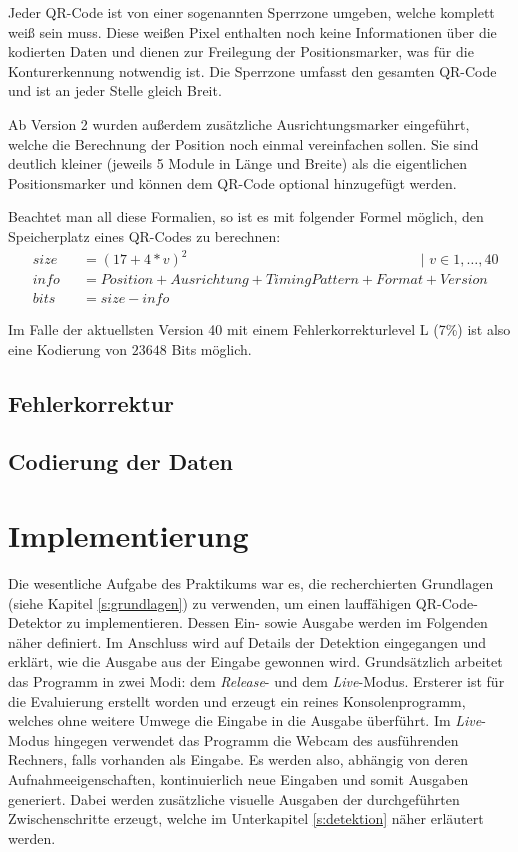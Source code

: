 \documentclass[a4paper, oneside, 12pt]{article}
\begin{document}
Jeder QR-Code ist von einer sogenannten Sperrzone umgeben, welche komplett weiß sein muss. Diese weißen Pixel enthalten noch keine Informationen über die kodierten Daten und dienen zur Freilegung der Positionsmarker, was für die Konturerkennung notwendig ist. Die Sperrzone umfasst den gesamten QR-Code und ist an jeder Stelle gleich Breit.

Ab Version 2 wurden außerdem zusätzliche Ausrichtungsmarker eingeführt, welche die Berechnung der Position noch einmal vereinfachen sollen. Sie sind deutlich kleiner (jeweils 5 Module in Länge und Breite) als die eigentlichen Positionsmarker und können dem QR-Code optional hinzugefügt werden.

Beachtet man all diese Formalien, so ist es mit folgender Formel möglich, den Speicherplatz eines QR-Codes zu berechnen:
\begin{align*}
&size &&= (17 + 4 * v)^2 \hspace{200pt} | \,\, v \in 1,\dots,40\\
&info &&= Position + Ausrichtung + TimingPattern + Format + Version\\
&bits &&= size - info
\end{align*}

Im Falle der aktuellsten Version 40 mit einem Fehlerkorrekturlevel L (7\%) ist also eine Kodierung von $23648$ Bits möglich.

\subsection{Fehlerkorrektur}
\label{ss:fehlerkorrektur}

\subsection{Codierung der Daten}
\label{ss:codierung}




\newpage

\section{Implementierung}
\label{s:implementierung}

Die wesentliche Aufgabe des Praktikums war es, die recherchierten Grundlagen (siehe Kapitel \ref{s:grundlagen}) zu verwenden, um einen lauffähigen QR-Code-Detektor zu implementieren. Dessen Ein- sowie Ausgabe werden im Folgenden näher definiert.
Im Anschluss wird auf Details der Detektion eingegangen und erklärt, wie die Ausgabe aus der Eingabe gewonnen wird.
Grundsätzlich arbeitet das Programm in zwei Modi: dem \emph{Release}- und dem \emph{Live}-Modus.
Ersterer ist für die Evaluierung erstellt worden und erzeugt ein reines Konsolenprogramm, welches ohne weitere Umwege die Eingabe in die Ausgabe überführt.
Im \emph{Live}-Modus hingegen verwendet das Programm die Webcam des ausführenden Rechners, falls vorhanden als Eingabe. Es werden also, abhängig von deren Aufnahmeeigenschaften, kontinuierlich neue Eingaben und somit Ausgaben generiert. Dabei werden zusätzliche visuelle Ausgaben der durchgeführten Zwischenschritte erzeugt, welche im Unterkapitel \ref{s:detektion} näher erläutert werden.
\end{document}
